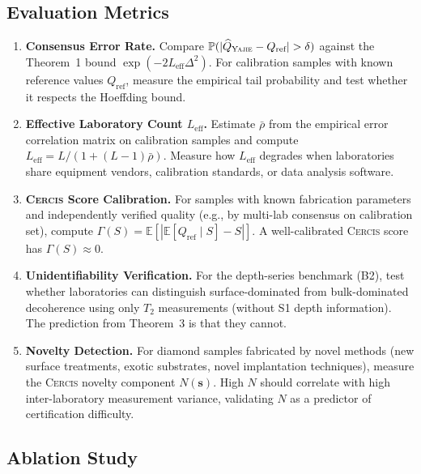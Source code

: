\documentclass[11pt,a4paper]{article}
\newcommand{\eff}{\mathrm{eff}}
\theoremstyle{definition}
\newcommand{\Yajie}{\textsc{Yajie}}
\newcommand{\Cercis}{\textsc{Cercis}}
\newcommand{\E}{\mathbb{E}}
\newcommand{\Pbb}{\mathbb{P}}
\newcommand{\Ttwo}{T_2}
\begin{document}
\subsection{Evaluation Metrics}

\begin{enumerate}[label=\textbf{M\arabic*:}, leftmargin=*]
    \item \textbf{Consensus Error Rate.} Compare $\Pbb(|\widehat{Q}_{\Yajie} - Q_{\text{ref}}| > \delta)$
    against the Theorem~1 bound $\exp(-2 L_{\eff} \Delta^2)$. For calibration
    samples with known reference values $Q_{\text{ref}}$, measure the empirical
    tail probability and test whether it respects the Hoeffding bound.

    \item \textbf{Effective Laboratory Count $L_{\eff}$.} Estimate
    $\bar{\rho}$ from the empirical error correlation matrix on calibration
    samples and compute $L_{\eff} = L / (1 + (L-1)\bar{\rho})$. Measure how
    $L_{\eff}$ degrades when laboratories share equipment vendors, calibration
    standards, or data analysis software.

    \item \textbf{\Cercis{} Score Calibration.} For samples with known
    fabrication parameters and independently verified quality (e.g., by
    multi-lab consensus on calibration set), compute $\Gamma(S) = \E[|\E[Q_{\text{ref}} \mid S] - S|]$.
    A well-calibrated \Cercis{} score has $\Gamma(S) \approx 0$.

    \item \textbf{Unidentifiability Verification.} For the depth-series
    benchmark (B2), test whether laboratories can distinguish surface-dominated
    from bulk-dominated decoherence using only $\Ttwo$ measurements (without
    S1 depth information). The prediction from Theorem~3 is that they cannot.

    \item \textbf{Novelty Detection.} For diamond samples fabricated by
    novel methods (new surface treatments, exotic substrates, novel implantation
    techniques), measure the \Cercis{} novelty component $N(\mathbf{s})$.
    High $N$ should correlate with high inter-laboratory measurement variance,
    validating $N$ as a predictor of certification difficulty.
\end{enumerate}

\subsection{Ablation Study}
\end{document}
